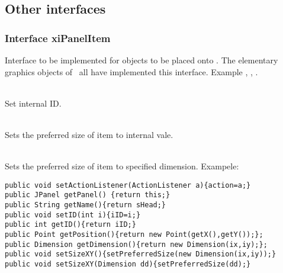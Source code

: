 \item {}
\item {}
\item {}
\item {}
\item {}
\item {}
\item {}
\item {}
\item {}
\item {}
\item {}
\item {}
\item {}
\item {}
\item {}
\item {}
\item {}
\ecir
\subsection{Other interfaces}
\subsubsection{Interface xiPanelItem}
Interface to be implemented for objects to be placed onto .
The elementary graphics objects of \gui\ all have implemented this interface.
Example , , .
\bcir
\item {}
\item {}
\item {}
\item {}
\item {}
\item {}
\item {}\\
Set internal ID.
\item {}\\
Sets the preferred size of item to internal vale.
\item {}\\
Sets the preferred size of item to specified dimension.
\ecir
Exampele:
\begin{verbatim}
public void setActionListener(ActionListener a){action=a;}
public JPanel getPanel() {return this;}
public String getName(){return sHead;}
public void setID(int i){iID=i;}
public int getID(){return iID;}
public Point getPosition(){return new Point(getX(),getY());};
public Dimension getDimension(){return new Dimension(ix,iy);};
public void setSizeXY(){setPreferredSize(new Dimension(ix,iy));}
public void setSizeXY(Dimension dd){setPreferredSize(dd);}
\end{verbatim}
